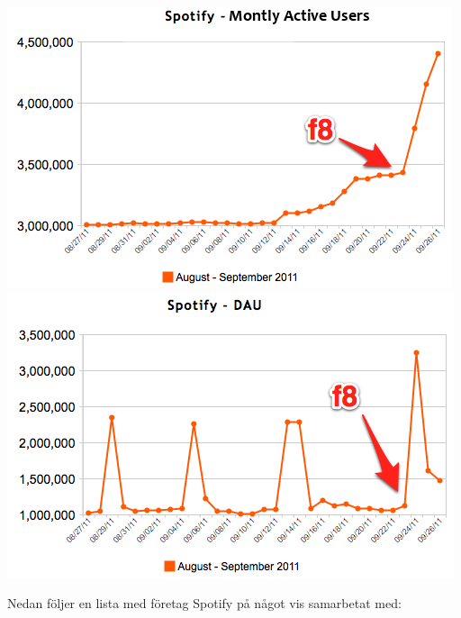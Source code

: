 \includegraphics[width=\linewidth]{images/MAU2011.png}
\includegraphics[width=\linewidth]{images/DAU2011.png}



Nedan följer en lista med företag Spotify på något vis samarbetat med:


